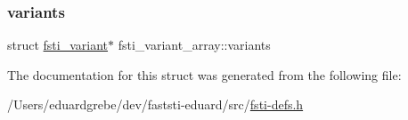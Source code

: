 \mbox{\label{structfsti__variant__array_a1dfd401c440b5b040c3ff373c3f04930}} 
\subsubsection{\texorpdfstring{variants}{variants}}
{\footnotesize\ttfamily struct \mbox{\hyperlink{structfsti__variant}{fsti\+\_\+variant}}$\ast$ fsti\+\_\+variant\+\_\+array\+::variants}



The documentation for this struct was generated from the following file\+:\begin{DoxyCompactItemize}
\item 
/\+Users/eduardgrebe/dev/faststi-\/eduard/src/\mbox{\hyperlink{fsti-defs_8h}{fsti-\/defs.\+h}}\end{DoxyCompactItemize}
